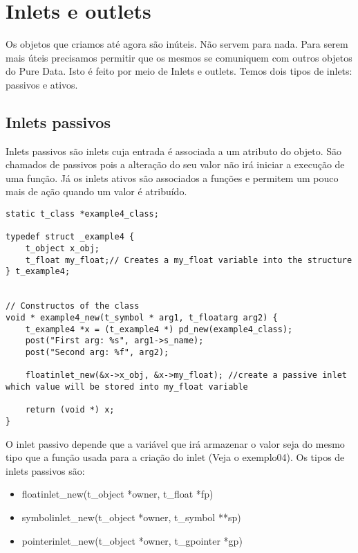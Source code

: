 
\chapter{Inlets e outlets}
Os objetos que criamos até agora são inúteis. Não servem para nada. Para serem
mais úteis precisamos permitir que os mesmos se comuniquem com outros objetos
do Pure Data. Isto é feito por meio de Inlets e outlets. Temos dois tipos de
inlets: passivos e ativos. 

\section{Inlets passivos}
Inlets passivos são inlets cuja entrada é associada a um atributo do objeto.
São chamados de passivos pois a alteração do seu valor não irá iniciar a
execução de uma função. Já os inlets ativos são associados a funções e permitem
um pouco mais de ação quando um valor é atribuído.

\begin{lstlisting}
static t_class *example4_class;

typedef struct _example4 {
    t_object x_obj;
    t_float my_float;// Creates a my_float variable into the structure
} t_example4;


// Constructos of the class
void * example4_new(t_symbol * arg1, t_floatarg arg2) {
    t_example4 *x = (t_example4 *) pd_new(example4_class);
    post("First arg: %s", arg1->s_name);
    post("Second arg: %f", arg2);

    floatinlet_new(&x->x_obj, &x->my_float); //create a passive inlet which value will be stored into my_float variable

    return (void *) x;
}
\end{lstlisting}

O inlet passivo depende que a variável que irá armazenar o valor seja do mesmo
tipo que a função usada para a criação do inlet (Veja o exemplo04). Os tipos de
inlets passivos são:

\begin{itemize}
\item floatinlet\_new(t\_object *owner, t\_float *fp)
\item symbolinlet\_new(t\_object *owner, t\_symbol **sp)
\item pointerinlet\_new(t\_object *owner, t\_gpointer *gp)
\end{itemize}

